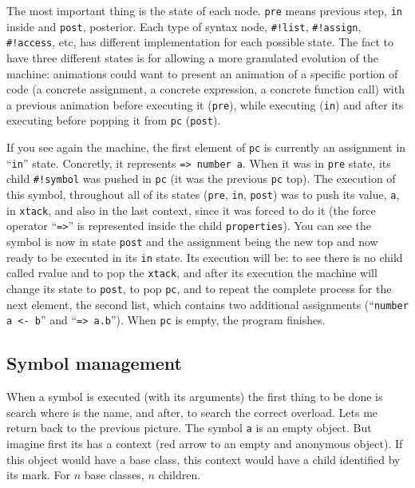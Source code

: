 \documentclass{article}
\begin{document}
The most important thing is the state of each node. \texttt{pre} means previous
step, \texttt{in} inside and \texttt{post}, posterior. Each type of syntax node,
\texttt{\#!list}, \texttt{\#!assign}, \texttt{\#!access}, etc, has different
implementation for each possible state. The fact to have three different states
is for allowing a more granulated evolution of the machine: animations could
want to present an animation of a specific portion of code (a concrete
assignment, a concrete expression, a concrete function call) with a previous
animation before executing it (\texttt{pre}), while executing (\texttt{in}) and
after its executing before popping it from \texttt{pc} (\texttt{post}).

If you see again the machine, the first element of \texttt{pc} is currently an
assignment in ``\texttt{in}'' state. Concretly, it represents \texttt{=> number
  a}. When it was in \texttt{pre} state, its child \texttt{\#!symbol} was pushed
in \texttt{pc} (it was the previous \texttt{pc} top). The execution of this
symbol, throughout all of its states (\texttt{pre}, \texttt{in}, \texttt{post})
was to push its value, \texttt{a}, in \texttt{xtack}, and also in the last
context, since it was forced to do it (the force operator ``\texttt{=>}'' is
represented inside the child \texttt{properties}). You can see the symbol is now
in state \texttt{post} and the assignment being the new top and now ready to be
executed in its \texttt{in} state. Its execution will be: to see there is no
child called rvalue and to pop the \texttt{xtack}, and after its execution the
machine will change its state to \texttt{post}, to pop \texttt{pc}, and to
repeat the complete process for the next element, the second list, which
contains two additional assignments (``\texttt{number a <- b}'' and ``\texttt{=>
  a.b}''). When \texttt{pc} is empty, the program finishes.

\subsection{Symbol management}
When a symbol is executed (with its arguments) the first thing to be done is
search where is the name, and after, to search the correct overload. Lets
me return back to the previous picture. The symbol \texttt{a} is an empty
object. But imagine first its has a context (red arrow to an empty and anonymous
object). If this object would have a base class, this context would have a child
identified by its mark. For $n$ base classes, $n$ children.
\end{document}
